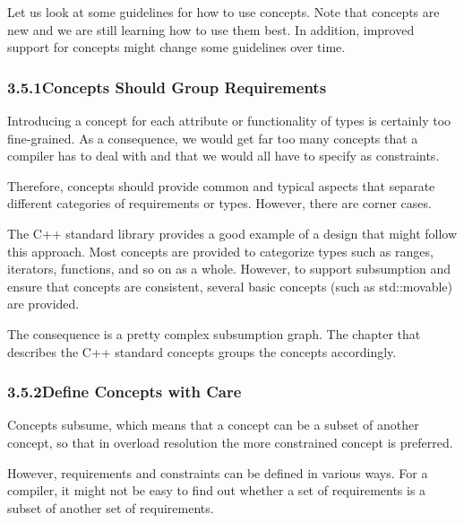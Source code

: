 
Let us look at some guidelines for how to use concepts. Note that concepts are new and we are still learning how to use them best. In addition, improved support for concepts might change some guidelines over time.

\subsubsection*{ 3.5.1\hspace{0.2cm}Concepts Should Group Requirements}


Introducing a concept for each attribute or functionality of types is certainly too fine-grained. As a consequence, we would get far too many concepts that a compiler has to deal with and that we would all have to specify as constraints.

Therefore, concepts should provide common and typical aspects that separate different categories of requirements or types. However, there are corner cases.

The C++ standard library provides a good example of a design that might follow this approach. Most concepts are provided to categorize types such as ranges, iterators, functions, and so on as a whole. However, to support subsumption and ensure that concepts are consistent, several basic concepts (such as std::movable) are provided.

The consequence is a pretty complex subsumption graph. The chapter that describes the C++ standard concepts groups the concepts accordingly.


\subsubsection*{ 3.5.2\hspace{0.2cm}Define Concepts with Care}

Concepts subsume, which means that a concept can be a subset of another concept, so that in overload resolution the more constrained concept is preferred.

However, requirements and constraints can be defined in various ways. For a compiler, it might not be easy to find out whether a set of requirements is a subset of another set of requirements.

